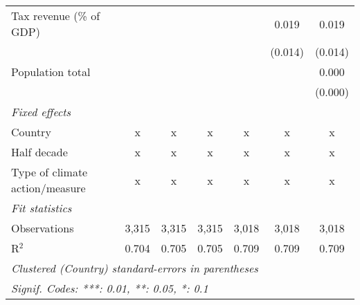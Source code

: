 \begin{tabular}{lcccccc}
   Tax revenue (\% of GDP)                                  &              &               &               &               & 0.019          & 0.019\\   
                                                            &              &               &               &               & (0.014)        & (0.014)\\   
   Population total                                         &              &               &               &               &                & 0.000\\   
                                                            &              &               &               &               &                & (0.000)\\   
   \emph{Fixed effects}\\
   Country                                                  & x            & x             & x             & x             & x              & x\\  
   Half decade                                              & x            & x             & x             & x             & x              & x\\  
   Type of climate action/measure                           & x            & x             & x             & x             & x              & x\\  
   \midrule \emph{Fit statistics}\\
   Observations                                             & 3,315        & 3,315         & 3,315         & 3,018         & 3,018          & 3,018\\  
   R$^2$                                                    & 0.704        & 0.705         & 0.705         & 0.709         & 0.709          & 0.709\\  
   \midrule
   \multicolumn{7}{l}{\emph{Clustered (Country) standard-errors in parentheses}}\\
   \multicolumn{7}{l}{\emph{Signif. Codes: ***: 0.01, **: 0.05, *: 0.1}}\\
\end{tabular}
\par\endgroup


